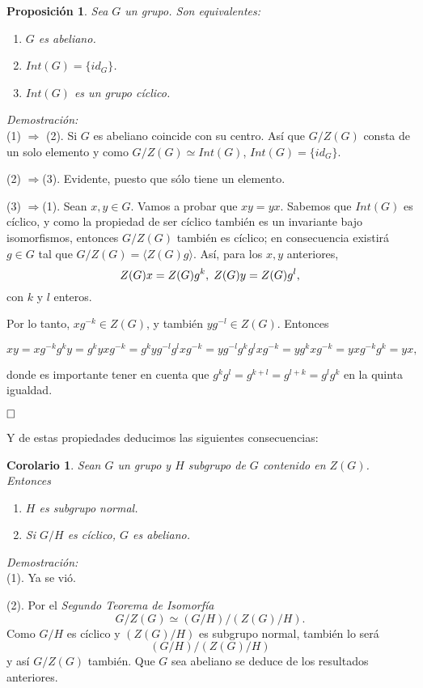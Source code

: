 \documentclass[12pt]{article}
\newtheorem{proposition}[theorem]{Proposición}
\newtheorem{corolario}{Corolario}[theorem]
\begin{document}
\begin{proposition}\label{eq:intG} Sea $G$ un grupo. Son equivalentes:
\begin{enumerate}
\item $G$ es abeliano.
\item $Int(G) = \lbrace id_{G} \rbrace$.
\item $Int(G)$ es un grupo cíclico.
\end{enumerate}
\end{proposition}
\emph{Demostración: }\\
(1) $\Longrightarrow$ (2). Si $G$ es abeliano coincide con su centro. Así que $G/Z(G)$ consta de un solo elemento y como $G/Z(G)\simeq Int(G)$, $Int(G) = \lbrace id_{G} \rbrace$.

(2) $\Longrightarrow$(3). Evidente, puesto que sólo tiene un elemento.

(3) $\Longrightarrow$(1). Sean $x,y \in G$. Vamos a probar que $xy = yx$. Sabemos que $Int(G)$ es cíclico, y como la propiedad de ser cíclico también es un invariante bajo isomorfismos, entonces $G/Z(G)$ también es cíclico; en consecuencia existirá $g\in G$ tal que $G/Z(G) = \langle Z(G)g \rangle$. Así, para los $x,y$ anteriores, $$Z(G)x = Z(G)g^{k}, \hspace{0.1cm} Z(G)y = Z(G)g^{l},$$ con $k$ y $l$ enteros.

Por lo tanto, $xg^{-k} \in Z(G)$, y también $yg^{-l} \in Z(G)$. Entonces \begin{center}$xy = xg^{-k}g^{k}y = g^{k}yxg^{-k} = g^{k}yg^{-l}g^{l}xg^{-k} = yg^{-l}g^{k}g^{l}xg^{-k} = yg^{k}xg^{-k} = yxg^{-k}g^{k} = yx,$\end{center} donde es importante tener en cuenta que $g^{k}g^{l} = g^{k+l} = g^{l+k} = g^{l}g^{k}$ en la quinta igualdad.

$\hfill \square$

Y de estas propiedades deducimos las siguientes consecuencias:

\begin{corolario}Sean $G$ un grupo y $H$ subgrupo de $G$ contenido en $Z(G)$. Entonces
\begin{enumerate}
\item $H$ es subgrupo normal.
\item Si $G/H$ es cíclico, $G$ es abeliano.
\end{enumerate}
\end{corolario}
\emph{Demostración: }\\
(1). Ya se vió.

(2). Por el \textit{Segundo Teorema de Isomorfía} $$G/Z(G) \simeq (G/H)/(Z(G)/H).$$ Como $G/H$ es cíclico y $(Z(G)/H)$ es subgrupo normal, también lo será $$(G/H)/(Z(G)/H)$$ y así $G/Z(G)$ también. Que $G$ sea abeliano se deduce de los resultados anteriores.
\end{document}
